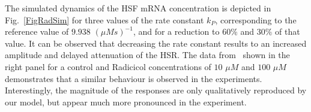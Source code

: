 \documentclass[oneside, 10pt, a4paper, twocolumn]{article}
\begin{document}
The simulated dynamics of the HSF mRNA concentration is depicted in Fig.~\ref{FigRadSim}
for three values of the rate constant $k_P$, corresponding to the reference value of $9.938$ $\left(\mu M s\right)^{-1}$,
and for a reduction to $60\%$ and $30\%$ of that value. 
It can be observed that decreasing the rate constant results to an increased amplitude and delayed attenuation of the HSR.
The data from~\cite{Schmollinger2013} shown in the right panel for a control and Radicicol concentrations of $10$ $\mu M$ and $100$ $\mu M$
demonstrates that a similar behaviour is observed in the experiments.
Interestingly, the magnitude of the responses are only qualitatively reproduced by our model, but
appear much more pronounced in the experiment. 

%

\end{document}
